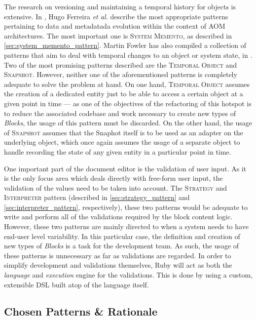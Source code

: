 The research on versioning and maintaining a temporal history for objects is extensive. In \cite{patterns_data_and_metadata_evolution_in_aoms}, Hugo Ferreira \textit{et al.} describe the most appropriate patterns pertaining to data and metadatada evolution within the context of AOM architectures. The most important one is \textsc{System Memento}, as described in \ref{sec:system_memento_pattern}. Martin Fowler has also compiled a collection of patterns that aim to deal with temporal changes to an object or system state, in \cite{fowler_pattern_for_things_that_change_with_time}. Two of the most promising patterns described are the \textsc{Temporal Object}\cite{fowler_temporal_object} and \textsc{Snapshot}\cite{fowler_snapshot}. However, neither one of the aforementioned patterns is completely adequate to solve the problem at hand. On one hand, \textsc{Temporal Object} assumes the creation of a dedicated entity just to be able to access a certain object at a given point in time --- as one of the objectives of the refactoring of this hotspot is to reduce the associated codebase and work necessary to create new types of \emph{Blocks}, the usage of this pattern must be discarded. On the other hand, the usage of \textsc{Snapshot} assumes that the Snaphot itself is to be used as an adapter on the underlying object, which once again assumes the usage of a separate object to handle recording the state of any given entity in a particular point in time.

One important part of the document editor is the validation of user input. As it is the only focus area which deals directly with free-form user input, the validation of the values need to be taken into account. The \textsc{Strategy} and \textsc{Interpreter} pattern (described in \ref{sec:strategy_pattern} and \ref{sec:interpreter_pattern}, respectively), these two patterns would be adequate to write and perform all of the validations required by the block content logic. However, these two patterns are mainly directed to when a system needs to have end-user level variability. In this particular case, the definition and creation of new types of \emph{Blocks} is a task for the development team. As such, the usage of these patterns is unnecessary as far as validations are regarded. In order to simplify development and validations themselves, Ruby will act as both the \emph{language} and \emph{execution} engine for the validations. This is done by using a custom, extensible DSL built atop of the language itself.

\subsection{Chosen Patterns \& Rationale}\label{sec:fa_documents_chosen_patterns_rationale}

